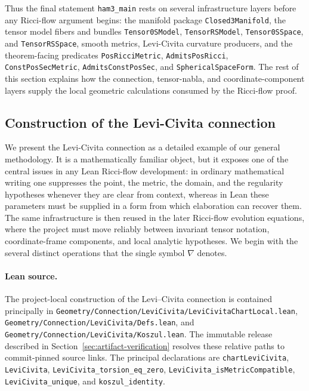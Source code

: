 \documentclass[11pt]{article}
\theoremstyle{plain}
\theoremstyle{definition}
\theoremstyle{remark}
\newcommand{\leanref}[1]{\nolinkurl{#1}}
\newcommand{\leanfile}[1]{\nolinkurl{#1}}
\newcommand{\rffile}[1]{\leanfile{#1}}
\begin{document}
Thus the final statement \leanref{ham3_main} rests on several infrastructure
layers before any Ricci-flow argument begins:
the manifold package \leanref{Closed3Manifold}, the tensor model fibers and
bundles \leanref{Tensor0SModel}, \leanref{TensorRSModel},
\leanref{Tensor0SSpace}, and \leanref{TensorRSSpace}, smooth metrics,
Levi-Civita curvature producers, and the theorem-facing predicates
\leanref{PosRicciMetric}, \leanref{AdmitsPosRicci},
\leanref{ConstPosSecMetric}, \leanref{AdmitsConstPosSec}, and
\leanref{SphericalSpaceForm}.  The rest of this section explains how the
connection, tensor-nabla, and coordinate-component layers supply the local
geometric calculations consumed by the Ricci-flow proof.

\subsection{Construction of the Levi-Civita connection}

We present the Levi-Civita connection as a detailed example of our general
methodology.  It is a mathematically familiar object, but it exposes one of the
central issues in any Lean Ricci-flow development: in ordinary mathematical
writing one suppresses the point, the metric, the domain, and the regularity
hypotheses whenever they are clear from context, whereas in Lean these
parameters must be supplied in a form from which elaboration can recover them.
The same infrastructure is then reused in the later Ricci-flow evolution
equations, where the project must move reliably between invariant tensor
notation, coordinate-frame components, and local analytic hypotheses.  We begin
with the several distinct operations that the single symbol $\nabla$ denotes.

\paragraph{Lean source.}
The project-local construction of the Levi--Civita connection is contained
principally in
\rffile{Geometry/Connection/LeviCivita/LeviCivitaChartLocal.lean},
\rffile{Geometry/Connection/LeviCivita/Defs.lean}, and
\rffile{Geometry/Connection/LeviCivita/Koszul.lean}.  The immutable release
described in Section~\ref{sec:artifact-verification} resolves these relative
paths to commit-pinned source links.
The principal declarations are
\leanref{chartLeviCivita}, \leanref{LeviCivita},
\leanref{LeviCivita_torsion_eq_zero},
\leanref{LeviCivita_isMetricCompatible},
\leanref{LeviCivita_unique}, and \leanref{koszul_identity}.
\end{document}
